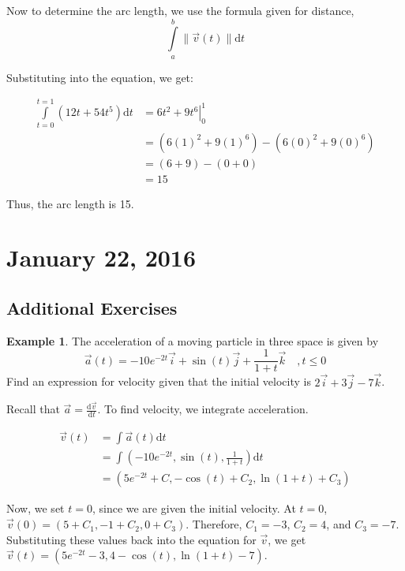 \documentclass[11pt]{article}
\theoremstyle{plain} %
\theoremstyle{definition}
\theoremstyle{example}
\newtheorem*{example}{Example}
\theoremstyle{remark}
\begin{document}
Now to determine the arc length, we use the formula given for distance, $$\int\limits_{a}^{b}\|\vec{v}(t)\| \mathrm d t$$


Substituting into the equation, we get:


\begin{align*}
	\int\limits_{t=0}^{t=1}(12t + 54t^5) \mathrm d t &= \left.6t^2+9t^6\right|_0^1\\
	&= \left(6(1)^2+9(1)^6\right) - \left(6(0)^2+9(0)^6\right)\\
	&= (6+9) - (0 + 0)\\
	&= 15
\end{align*}


Thus, the arc length is 15.






\section{January 22, 2016}
\subsection{Additional Exercises}

\begin{example}
The acceleration of a moving particle in three space is given by $$\vec{a}(t) = -10e^{-2t}\vec{i} + \sin(t)\vec{j} + \frac{1}{1+t}\vec{k}\quad, t\leq 0$$ Find an expression for velocity given that the initial velocity is $2\vec{i} + 3\vec{j} -7\vec{k}$.
\end{example}



Recall that $\vec{a} = \frac{\mathrm d \vec{v}}{\mathrm d t}$.
To find velocity, we integrate acceleration. 

\begin{align*}          
\vec{v}(t) &= \int \vec{a}(t) \mathrm d t\\
	&= \int \left(-10e^{-2t}, \sin(t), \frac{1}{1+t}\right)\mathrm d t\\
	&= \left(5e^{-2t} + C, -\cos(t)+ C_2, \ln(1+t)+C_3\right)
\end{align*}

Now, we set $t=0$, since we are given the initial velocity. At $t=0$, $\vec{v}(0) = (5+C_1, -1+C_2, 0+C_3)$. Therefore, $C_1 = -3$, $C_2 = 4$,  and $C_3=-7$. Substituting these values back into the equation for $\vec{v}$, we get $\vec{v}(t) = \left(5e^{-2t}-3, 4-\cos (t), \ln(1+t)-7\right)$.
\end{document}
